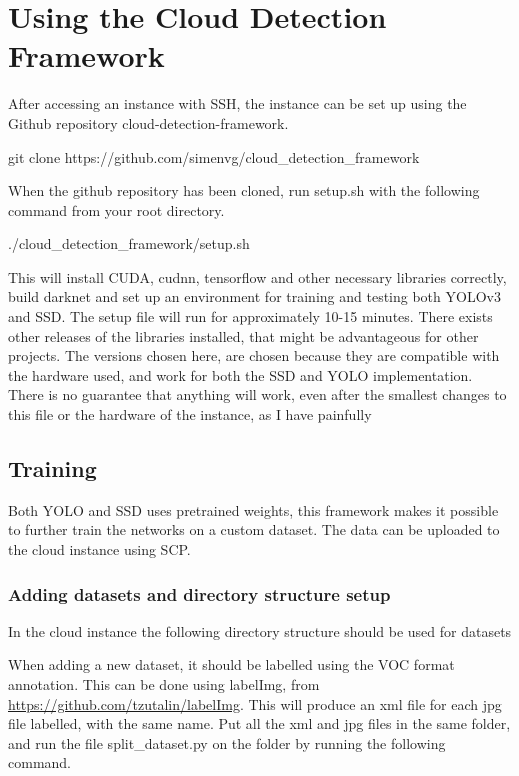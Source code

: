 
\chapter{Using the Cloud Detection Framework}
After accessing an instance with SSH, the instance can be set up using the Github repository cloud-detection-framework. 

\begin{lcverbatim}
git clone https://github.com/simenvg/cloud\_detection\_framework
\end{lcverbatim}

When the github repository has been cloned, run setup.sh with the following command from your root directory.

\begin{lcverbatim}
./cloud\_detection\_framework/setup.sh
\end{lcverbatim}

This will install CUDA, cudnn, tensorflow and other necessary libraries correctly, build darknet and set up an environment for training and testing both YOLOv3 and SSD. The setup file will run for approximately 10-15 minutes. There exists other releases of the libraries installed, that might be advantageous for other projects. The versions chosen here, are chosen because they are compatible with the hardware used, and work for both the SSD and YOLO implementation. There is no guarantee that anything will work, even after the smallest changes to this file or the hardware of the instance, as I have painfully 

\section{Training}
Both YOLO and SSD uses pretrained weights, this framework makes it possible to further train the networks on a custom dataset. The data can be uploaded to the cloud instance using SCP. 
\newpage
\subsection{Adding datasets and directory structure setup}
In the cloud instance the following directory structure should be used for datasets



When adding a new dataset, it should be labelled using the VOC format annotation. This can be done using labelImg, from \url{https://github.com/tzutalin/labelImg}. This will produce an xml file for each jpg file labelled, with the same name. Put all the xml and jpg files in the same folder, and run the file split\_dataset.py on the folder by running the following command.

